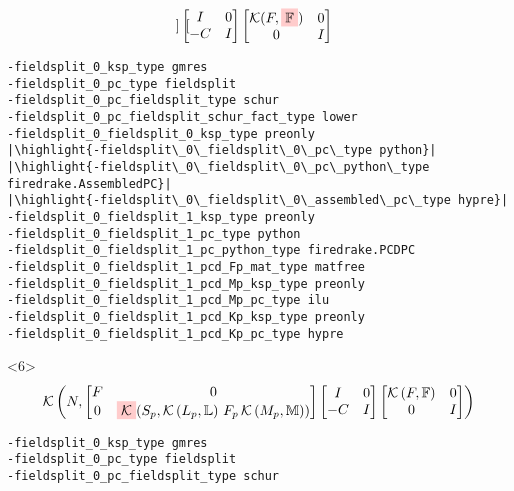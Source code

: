 \documentclass[presentation]{beamer}
\newcommand{\KSP}[2]{\ensuremath{\mathcal{K}\left(#1, \mathbb{#2}\right)}}
\newcommand{\ksp}[1]{\KSP{#1}{#1}}
\newcommand{\highlight}[1]{\colorbox{red!20}{\color{black} #1}}
\begin{document}
\begin{frame}[fragile]
\begin{onlyenv}
\begin{equation*}
{\begin{bmatrix}
      \end{bmatrix}
      \begin{bmatrix}
        I & 0\\
        -C & I
      \end{bmatrix}
      \begin{bmatrix}
        \mathcal{K}(F, \highlight{$\mathbb{F}$}) & 0 \\
        0 & I
      \end{bmatrix}}
    \end{equation*}
\begin{verbatim}
-fieldsplit_0_ksp_type gmres
-fieldsplit_0_pc_type fieldsplit
-fieldsplit_0_pc_fieldsplit_type schur
-fieldsplit_0_pc_fieldsplit_schur_fact_type lower
-fieldsplit_0_fieldsplit_0_ksp_type preonly
|\highlight{-fieldsplit\_0\_fieldsplit\_0\_pc\_type python}|
|\highlight{-fieldsplit\_0\_fieldsplit\_0\_pc\_python\_type firedrake.AssembledPC}|
|\highlight{-fieldsplit\_0\_fieldsplit\_0\_assembled\_pc\_type hypre}|
-fieldsplit_0_fieldsplit_1_ksp_type preonly
-fieldsplit_0_fieldsplit_1_pc_type python
-fieldsplit_0_fieldsplit_1_pc_python_type firedrake.PCDPC
-fieldsplit_0_fieldsplit_1_pcd_Fp_mat_type matfree
-fieldsplit_0_fieldsplit_1_pcd_Mp_ksp_type preonly
-fieldsplit_0_fieldsplit_1_pcd_Mp_pc_type ilu
-fieldsplit_0_fieldsplit_1_pcd_Kp_ksp_type preonly
-fieldsplit_0_fieldsplit_1_pcd_Kp_pc_type hypre
\end{verbatim}
  \end{onlyenv}
  \begin{onlyenv}<6>
    \color{gray}
    \begin{equation*}
      \KSP{N}{%
        \begin{bmatrix}
        F & 0 \\
        0 & \highlight{$\mathcal{K}$}(S_p, \KSP{L_p}{L}\,F_p \, \KSP{M_p}{M})
      \end{bmatrix}
      \begin{bmatrix}
        I & 0\\
        -C & I
      \end{bmatrix}
      \begin{bmatrix}
        \ksp{F} & 0 \\
        0 & I
      \end{bmatrix}}
    \end{equation*}
\begin{verbatim}
-fieldsplit_0_ksp_type gmres
-fieldsplit_0_pc_type fieldsplit
-fieldsplit_0_pc_fieldsplit_type schur

\end{verbatim}
\end{onlyenv}
\end{frame}
\end{document}

